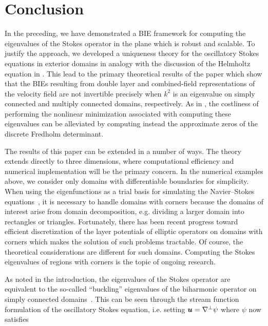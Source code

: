 \section{Conclusion}
\label{sec:conclusion}

In the preceding, we have demonstrated a
BIE framework for computing the eigenvalues
of the Stokes operator in the plane which
is robust and scalable.
%
To justify the
approach, we developed a uniqueness theory
for the oscillatory Stokes equations in
exterior domains in analogy with the
discussion of the Helmholtz equation in
\cite{colton1983integral}.
%
This lead to the primary theoretical
results of the paper which show that the
BIEs resulting from double layer and
combined-field representations of the
velocity field are 
not invertible precisely when $k^2$ is
an eigenvalue on simply connected
and multiply connected domains, respectively.
%
As in \cite{zhao2015robust}, the costliness
of performing the nonlinear minimization
associated with computing these eigenvalues
can be alleviated by computing instead the
approximate zeros of the discrete Fredholm
determinant.

The results of this paper can be
extended in a number of ways.
%
The theory
extends directly to three dimensions, where
computational efficiency and numerical
implementation will be the primary concern.
%
In the numerical examples above, we
consider only domains with differentiable
boundaries for simplicity.
%
When using the eigenfunctions as a trial
basis for simulating the Navier--Stokes
equations~\cite{batcho1994generalized},
it is necessary to handle domains
with corners because the domains of interest
arise from domain decomposition, e.g.
dividing a larger domain into 
rectangles or triangles.
Fortunately, there has been recent progress
toward efficient discretization of the
layer potentials of elliptic operators
on domains with corners
\cite{helsing2008corner,serkh2016solution,rachh2017solution,helsing2018integral}
which makes the solution of such problems
tractable.
%
Of course, the theoretical considerations
are different for such domains.
%
Computing the Stokes eigenvalues of regions
with corners is the topic of ongoing
research.

As noted in the introduction, the
eigenvalues of the Stokes operator are
equivalent to the so-called
``buckling'' eigenvalues of the
biharmonic operator on simply connected
domains~\cite{kelliher2009eigenvalues}.
%
This can be seen through the stream function
formulation  of the oscillatory Stokes
equation, i.e. setting ${\boldsymbol u} = \nabla^\perp \psi$
where $\psi$ now satisfies

